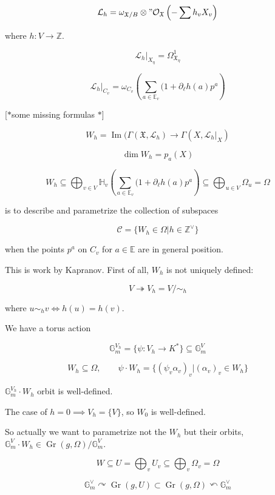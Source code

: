 \medskip{}

$$
\mathcal{L}_{h}=\omega_{\mathfrak{X}
/B}\otimes"\mathcal{O}_{\mathfrak{X} }\left(
-\sum h_vX_v \right)
$$

where $h:V\longrightarrow \mathbb{Z}$.

$$
\mathcal{L}_{h}|_{X_\eta}=\Omega^1_{
\mathfrak{X}_\eta}
$$

$$
\mathcal{L}_{h}|_{C_v}=\omega_{C_v}\left(
\sum_{a\in\mathbb{E}_{v}}
(1+\partial_{\ell}h(a)p^a \right)
$$

[$*$some missing formulas $*$]

$$
W_h=\operatorname{Im}(\Gamma(\mathfrak{X},
\mathcal{L}_{h})\longrightarrow
\Gamma(X,\mathcal{L}_{h}|_{X})
$$

$$
\dim W_h=p_a(X)
$$

$$
W_h\subseteq \bigoplus_{v\in
V}\mathbb{H}_v\left(
\sum_{a\in\mathbb{E}_v}(1+\partial_\ell
h(a)p^a \right) \subseteq \bigoplus_{u\in
V}\Omega_u    =\Omega
$$

\medskip{}
is to describe and parametrize the collection
of subspaces

$$
\mathcal{C}=\{W_h\in\Omega|h\in\mathbb{Z}^
\vee\}
$$

when the points $p^a$ on  $C_v$ for  $a \in
\mathbb{E}$ are in general position.

\medskip{}

This is work by Kapranov. First of all, $W_h$
is not uniquely defined:

$$
V\twoheadrightarrow V_h=V/\sim_h
$$

where $u\sim_h v\iff h(u)=h(v)$.

We have a torus action

$$
\mathbb{G}^{V_h}_m=\{\psi:V_h\longrightarrow
K^*\} \subseteq \mathbb{G}^V_m
$$

$$
W_h\subseteq \Omega,\qquad \psi\cdot
W_h=\{(\psi_v\alpha_v)_v|(\alpha_v)_v\in
W_h\}
$$

$\mathbb{G}^{V_h}_m\cdot W_h$ orbit is
well-defined.

The case of $h=0\implies V_h=\{V\}$, so $W_0$
is well-defined.

So actually we want to parametrize not the
$W_h$ but their orbits, $\mathbb{G}^V_m\cdot
W_h\in
\operatorname{Gr}(g,\Omega)/\mathbb{G}^V_m$.

$$
W\subseteq U=\bigoplus_{v} U_v\subseteq
\bigoplus_{v} \Omega_v=\Omega
$$

$$
\mathbb{G}^\vee_m\curvearrowright
\operatorname{Gr}(g,U)\subset
\operatorname{Gr}(g,\Omega)\curvearrowleft
\mathbb{G}^\vee_m
$$

